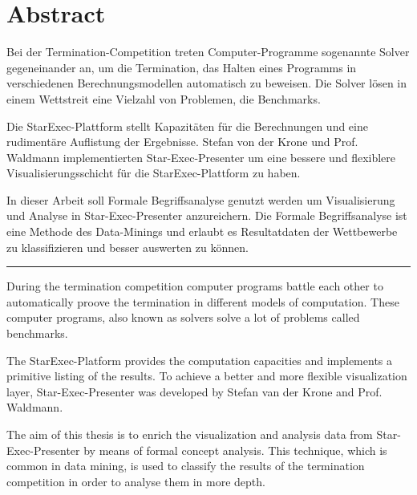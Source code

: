 \chapter*{Abstract}

\setcounter{page}{1}

Bei der Termination-Competition treten Computer-Programme sogenannte Solver gegeneinander an, um die Termination, das Halten eines Programms in verschiedenen Berechnungsmodellen automatisch zu beweisen. Die Solver lösen in einem Wettstreit eine Vielzahl von Problemen, die Benchmarks.

Die StarExec-Plattform stellt Kapazitäten für die Berechnungen und eine rudimentäre Auflistung der Ergebnisse. Stefan von der Krone und Prof. Waldmann implementierten Star-Exec-Presenter um eine bessere und flexiblere Visualisierungsschicht für die StarExec-Plattform zu haben.

In dieser Arbeit soll Formale Begriffsanalyse genutzt werden um Visualisierung und Analyse in Star-Exec-Presenter anzureichern. Die Formale Begriffsanalyse ist eine Methode des Data-Minings und erlaubt es Resultatdaten der Wettbewerbe zu klassifizieren und besser auswerten zu können.

\vspace{.5cm}
\begin{center}
\rule{0.5\textwidth}{.4pt}
\end{center}
\vspace{.5cm}
During the termination competition computer programs battle each other to automatically proove the termination in different models of computation. These computer programs, also known as solvers solve a lot of problems called benchmarks.

The StarExec-Platform provides the computation capacities and implements a primitive listing of the results. To achieve a better and more flexible visualization layer, Star-Exec-Presenter was developed by Stefan van der Krone and Prof. Waldmann.

The aim of this thesis is to enrich the visualization and analysis data from Star-Exec-Presenter by means of formal concept analysis. This technique, which is common in data mining, is used to classify the results of the termination competition in order to analyse them in more depth.
